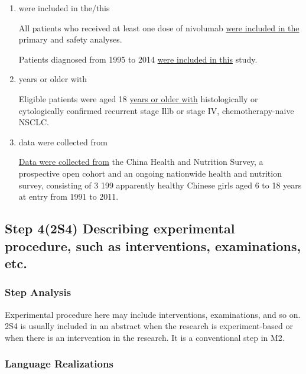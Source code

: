\documentclass{ctexbook}
\begin{document}
    \begin{enumerate}
      \item were included in the/this
      \begin{eg}{}
        All patients who received at least one dose of nivolumab \uline{were included in the} primary and safety analyses.
      \end{eg}
        
      \begin{eg}{}
        Patients diagnosed from 1995 to 2014 \uline{were included in this} study.
      \end{eg}

      \item years or older with
      \begin{eg}{}
        Eligible patients were aged 18 \uline{years or older with} histologically or cytologically confirmed recurrent stage Illb or stage IV, chemotherapy-naive NSCLC.
      \end{eg}

      \item data were collected from
      \begin{eg}{}
        \uline{Data were collected from} the China Health and Nutrition Survey, a prospective open cohort and an ongoing nationwide health and nutrition survey, consisting of 3 199 apparently healthy Chinese girls aged 6 to 18 years at entry from 1991 to 2011.
      \end{eg}
    \end{enumerate}

  \subsection{Step 4(2S4) Describing experimental procedure, such as interventions, examinations, etc.}

    \subsubsection{Step Analysis}

    Experimental procedure here may include interventions, examinations, and so on. 2S4 is usually included in an abstract when the research is experiment-based or when there is an intervention in the research. It is a conventional step in M2.

    \subsubsection{Language Realizations}
\end{document}
